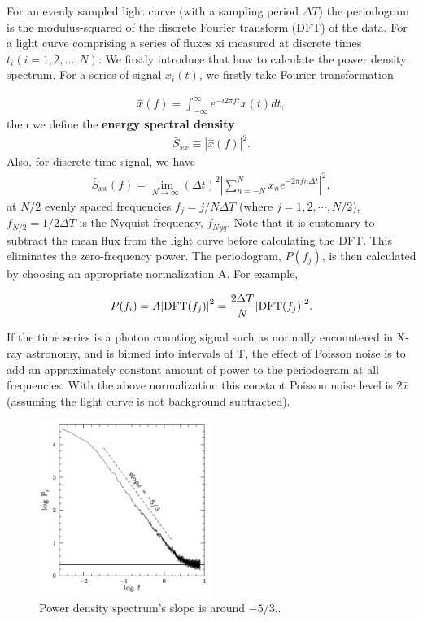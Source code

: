 \documentclass[prd,10pt]{revtex4-2}
\begin{document}
For an evenly sampled light curve (with a sampling period $\Delta T$) the periodogram is the modulus-squared of the discrete Fourier transform (DFT) of the data. For a light curve comprising a series of fluxes xi measured at discrete times $t_{i} (i = 1, 2, . . . , N )$:
We firstly introduce that how to calculate the power density spectrum. For a series of signal $x_{i}(t)$, we firstly take Fourier transformation

\begin{align}
    \hat{x}(f)=\int^{\infty}_{-\infty}  e^{-i2\pi f t}x(t)dt,
\end{align}
then we define the \textbf{energy spectral density}
\begin{align}
    \bar{S}_{x x} \equiv |\hat{x}(f)|^{2}.
\end{align} 
Also, for discrete-time signal, we have
\begin{align}
    \bar{S}_{x x}(f)=\lim_{N\rightarrow \infty}(\Delta t)^{2}\left|\sum_{n=-N}^{N}x_{n}e^{-2\pi fn\Delta t}\right|^{2},
\end{align}
at $N/2$ evenly spaced frequencies $f_{j}= j/N \Delta T$ (where $j = 1, 2,\cdots , N /2$), $f_{N/2} = 1/2 \Delta T$ is the Nyquist frequency, $f_{Nyq}$. Note that it is customary to subtract the mean flux from the light curve before calculating the DFT. This eliminates the zero-frequency power. The periodogram, $P( f_{j})$, is then calculated by choosing an appropriate normalization A. For example,

\begin{align}
    P(f_{i})=A\abs{\text{DFT}(f_{j})}^{2}=\frac{2\Delta T}{N}\abs{\text{DFT}(f_{j})}^{2}\label{DFT}.
\end{align}

If the time series is a photon counting signal such as normally encountered in X-ray astronomy, and is binned into intervals of T, the effect of Poisson noise is to add an approximately constant amount of power to the periodogram at all frequencies. With the above normalization this constant Poisson noise level is $2 \bar{x}$ (assuming the light curve is not background subtracted).

\begin{figure}[ht]
    \centering
    \includegraphics[width= 0.5\textwidth]{1.png}
    \caption{\label{fig:1.png}
        Power density spectrum's slope is around $-5/3$.\cite{Beloborodov:1998ai}.
    }
\end{figure}
\end{document}
